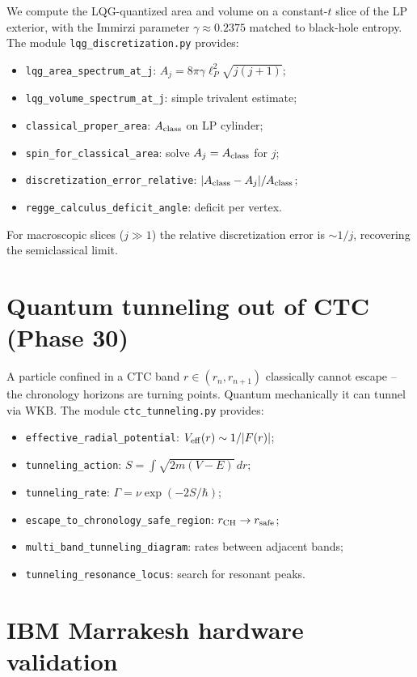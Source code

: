 \documentclass[11pt,a4paper]{article}
\begin{document}
We compute the LQG-quantized area and volume on a constant-$t$ slice
of the LP exterior, with the Immirzi parameter $\gamma \approx 0.2375$
matched to black-hole entropy. The module \texttt{lqg\_discretization.py}
provides:
\begin{itemize}
\item \texttt{lqg\_area\_spectrum\_at\_j}: $A_j = 8\pi\gamma \ell_P^2 \sqrt{j(j+1)}$;
\item \texttt{lqg\_volume\_spectrum\_at\_j}: simple trivalent estimate;
\item \texttt{classical\_proper\_area}: $A_{\rm class}$ on LP cylinder;
\item \texttt{spin\_for\_classical\_area}: solve $A_j = A_{\rm class}$ for $j$;
\item \texttt{discretization\_error\_relative}: $|A_{\rm class} - A_j|/A_{\rm class}$;
\item \texttt{regge\_calculus\_deficit\_angle}: deficit per vertex.
\end{itemize}

For macroscopic slices ($j \gg 1$) the relative discretization error
is $\sim 1/j$, recovering the semiclassical limit.

\section{Quantum tunneling out of CTC (Phase 30)}

A particle confined in a CTC band $r \in (r_n, r_{n+1})$ classically
cannot escape -- the chronology horizons are turning points. Quantum
mechanically it can tunnel via WKB. The module \texttt{ctc\_tunneling.py}
provides:
\begin{itemize}
\item \texttt{effective\_radial\_potential}: $V_{\rm eff}(r) \sim 1/|F(r)|$;
\item \texttt{tunneling\_action}: $S = \int \sqrt{2m(V-E)}\,dr$;
\item \texttt{tunneling\_rate}: $\Gamma = \nu \exp(-2 S/\hbar)$;
\item \texttt{escape\_to\_chronology\_safe\_region}: $r_{\rm CH} \to r_{\rm safe}$;
\item \texttt{multi\_band\_tunneling\_diagram}: rates between adjacent bands;
\item \texttt{tunneling\_resonance\_locus}: search for resonant peaks.
\end{itemize}

\section{IBM Marrakesh hardware validation}
\end{document}
